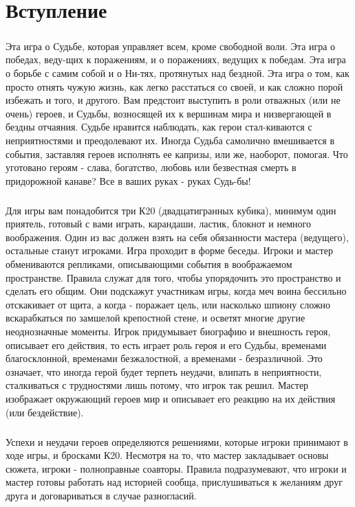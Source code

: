 \chapter*{Вступление}
\paragraph{}Эта игра о Судьбе, которая управляет всем, кроме свободной воли. Эта игра о победах, веду-щих к поражениям, и о поражениях, ведущих к победам. Эта игра о борьбе с самим собой и о Ни-тях, протянутых над бездной. Эта игра о том, как просто отнять чужую жизнь, как легко расстаться со своей, и как сложно порой избежать и того, и другого. 
\newline Вам предстоит выступить в роли отважных (или не очень) героев, и Судьбы, возносящей их к вершинам мира и низвергающей в бездны отчаяния. Судьбе нравится наблюдать, как герои стал-киваются с неприятностями и преодолевают их. Иногда Судьба самолично вмешивается в события, заставляя героев исполнять ее капризы, или же, наоборот, помогая. Что уготовано героям - слава, богатство, любовь или безвестная смерть в придорожной канаве? Все в ваших руках - руках Судь-бы!

\paragraph{}Для игры вам понадобится три К20 (двадцатигранных кубика), минимум один приятель, готовый с вами играть, карандаши, ластик, блокнот и немного воображения. Один из вас должен взять на себя обязанности мастера (ведущего), остальные станут игроками. Игра проходит в форме беседы. Игроки и мастер обмениваются репликами, описывающими события в воображаемом пространстве. Правила служат для того, чтобы упорядочить это пространство и сделать его общим. Они подскажут участникам игры, когда меч воина бессильно отскакивает от щита, а когда - поражает цель, или насколько шпиону сложно вскарабкаться по замшелой крепостной стене, и осветят многие другие неоднозначные моменты. Игрок придумывает биографию и внешность героя, описывает его действия, то есть играет роль героя и его Судьбы, временами благосклонной, временами безжалостной, а временами - безразличной. Это означает, что иногда герой будет терпеть неудачи, влипать в неприятности, сталкиваться с трудностями лишь потому, что игрок так решил. Мастер изображает окружающий героев мир и описывает его реакцию на их действия (или бездействие).

\paragraph{}Успехи и неудачи героев определяются решениями, которые игроки принимают в ходе игры, и бросками К20. Несмотря на то, что мастер закладывает основы сюжета, игроки - полноправные соавторы. Правила подразумевают, что игроки и мастер готовы работать над историей сообща, прислушиваться к желаниям друг друга и договариваться в случае разногласий.

